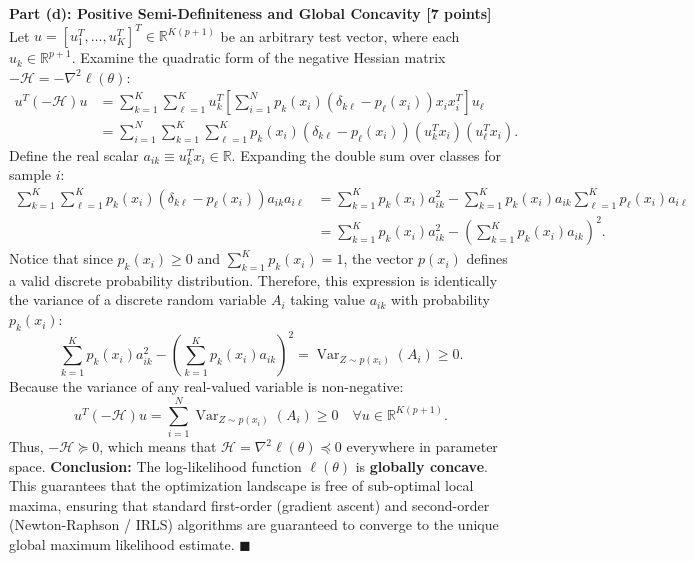 \documentclass[11pt,a4paper]{article}
\begin{document}
\vspace{4pt}
\textbf{Part (d): Positive Semi-Definiteness and Global Concavity [7 points]} \\
Let $u = [u_1^T, \dots, u_K^T]^T \in \mathbb{R}^{K(p+1)}$ be an arbitrary test vector, where each $u_k \in \mathbb{R}^{p+1}$.
Examine the quadratic form of the negative Hessian matrix $-\mathcal{H} = -\nabla^2 \ell(\theta)$:
\begin{align*}
  u^T (-\mathcal{H}) u &= \sum_{k=1}^K \sum_{\ell=1}^K u_k^T \left[ \sum_{i=1}^N p_k(x_i) (\delta_{k\ell} - p_\ell(x_i)) x_i x_i^T \right] u_\ell \\
  &= \sum_{i=1}^N \sum_{k=1}^K \sum_{\ell=1}^K p_k(x_i) (\delta_{k\ell} - p_\ell(x_i)) (u_k^T x_i)(u_\ell^T x_i).
\end{align*}
Define the real scalar $a_{ik} \equiv u_k^T x_i \in \mathbb{R}$. Expanding the double sum over classes for sample $i$:
\begin{align*}
  \sum_{k=1}^K \sum_{\ell=1}^K p_k(x_i)(\delta_{k\ell} - p_\ell(x_i)) a_{ik} a_{i\ell} &= \sum_{k=1}^K p_k(x_i) a_{ik}^2 - \sum_{k=1}^K p_k(x_i) a_{ik} \sum_{\ell=1}^K p_\ell(x_i) a_{i\ell} \\
  &= \sum_{k=1}^K p_k(x_i) a_{ik}^2 - \left( \sum_{k=1}^K p_k(x_i) a_{ik} \right)^2.
\end{align*}
Notice that since $p_k(x_i) \ge 0$ and $\sum_{k=1}^K p_k(x_i) = 1$, the vector $p(x_i)$ defines a valid discrete probability distribution. Therefore, this expression is identically the variance of a discrete random variable $A_i$ taking value $a_{ik}$ with probability $p_k(x_i)$:
\[
  \sum_{k=1}^K p_k(x_i) a_{ik}^2 - \left( \sum_{k=1}^K p_k(x_i) a_{ik} \right)^2 = \operatorname{Var}_{Z \sim p(x_i)}(A_i) \ge 0.
\]
Because the variance of any real-valued variable is non-negative:
\[
  u^T (-\mathcal{H}) u = \sum_{i=1}^N \operatorname{Var}_{Z \sim p(x_i)}(A_i) \ge 0 \quad \forall u \in \mathbb{R}^{K(p+1)}.
\]
Thus, $-\mathcal{H} \succeq 0$, which means that $\mathcal{H} = \nabla^2 \ell(\theta) \preceq 0$ everywhere in parameter space.
\textbf{Conclusion:} The log-likelihood function $\ell(\theta)$ is \textbf{globally concave}. This guarantees that the optimization landscape is free of sub-optimal local maxima, ensuring that standard first-order (gradient ascent) and second-order (Newton-Raphson / IRLS) algorithms are guaranteed to converge to the unique global maximum likelihood estimate. $\blacksquare$

\vspace{22pt}
\end{document}
